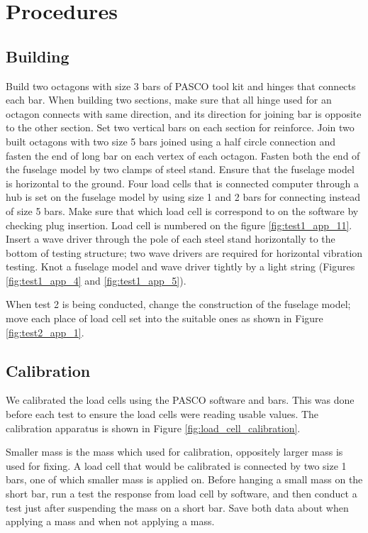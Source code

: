 \documentclass[12 pt]{report}
\begin{document}
\section{Procedures} \label{procedures}
\subsection{Building} \label{building}
Build two octagons with size \num{3} bars of PASCO tool kit and hinges that connects each bar. When building two sections, make sure that all hinge used for an octagon connects with same direction, and its direction for joining bar is opposite to the other section. Set two vertical bars on each section for reinforce. Join two built octagons with two size \num{5} bars joined using a half circle connection and fasten the end of long bar on each vertex of each octagon. Fasten both the end of the fuselage model by two clamps of steel stand. Ensure that the fuselage model is horizontal to the ground. Four load cells that is connected computer through a hub is set on the fuselage model by using size \num{1} and \num{2} bars for connecting instead of size \num{5} bars. Make sure that which load cell is correspond to on the software by checking plug insertion. Load cell is numbered on the figure \ref{fig:test1_app_11}. Insert a wave driver through the pole of each steel stand horizontally to the bottom of testing structure; two wave drivers are required for horizontal vibration testing. Knot a fuselage model and wave driver tightly by a light string (Figures \ref{fig:test1_app_4} and \ref{fig:test1_app_5}). 

When test \num{2} is being conducted, change the construction of the fuselage model; move each place of load cell set into the suitable ones as shown in Figure \ref{fig:test2_app_1}.

\subsection{Calibration} \label{calibration}
We calibrated the load cells using the PASCO software and bars. This was done before each test to ensure the load cells were reading usable values. The calibration apparatus is shown in Figure \ref{fig:load_cell_calibration}.

Smaller mass is the mass which used for calibration, oppositely larger mass is used for fixing. A load cell that would be calibrated is connected by two size \num{1} bars, one of which smaller mass is applied on. Before hanging a small mass on the short bar, run a test the response from load cell by software, and then conduct a test just after suspending the mass on a short bar. Save both data about when applying a mass and when not applying a mass.  
\end{document}
